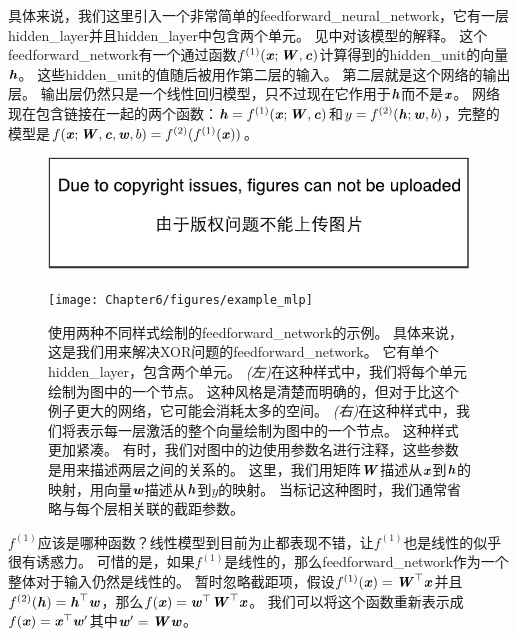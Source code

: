 具体来说，我们这里引入一个非常简单的\gls{feedforward_neural_network}，它有一层\gls{hidden_layer}并且\gls{hidden_layer}中包含两个单元。
见中对该模型的解释。
这个\gls{feedforward_network}有一个通过函数$f^{(1)}(\Vx;\MW, \Vc)$计算得到的\gls{hidden_unit}的向量$\Vh$。
这些\gls{hidden_unit}的值随后被用作第二层的输入。
第二层就是这个网络的输出层。
输出层仍然只是一个线性回归模型，只不过现在它作用于$\Vh$而不是$\Vx$。
网络现在包含链接在一起的两个函数：$\Vh=f^{(1)}(\Vx; \MW, \Vc)$和$y = f^{(2)}(\Vh; \Vw, b)$，完整的模型是$f(\Vx; \MW, \Vc, \Vw, b) = f^{(2)}(f^{(1)}(\Vx))$。
\begin{figure}[!htb]
\ifOpenSource
\centerline{\includegraphics{figure.pdf}}
\else
\centerline{\texttt{[image: Chapter6/figures/example\_mlp]}}
\fi
\captionsetup{singlelinecheck=off}
\caption{使用两种不同样式绘制的\gls{feedforward_network}的示例。
具体来说，这是我们用来解决XOR问题的\gls{feedforward_network}。
它有单个\gls{hidden_layer}，包含两个单元。
\emph{(左)}在这种样式中，我们将每个单元绘制为图中的一个节点。
这种风格是清楚而明确的，但对于比这个例子更大的网络，它可能会消耗太多的空间。
\emph{(右)}在这种样式中，我们将表示每一层激活的整个向量绘制为图中的一个节点。
这种样式更加紧凑。
有时，我们对图中的边使用参数名进行注释，这些参数是用来描述两层之间的关系的。
这里，我们用矩阵$\MW$描述从$\Vx$到$\Vh$的映射，用向量$\Vw$描述从$\Vh$到$y$的映射。
当标记这种图时，我们通常省略与每个层相关联的截距参数。}
\label{fig:chap6_example_mlp}
\end{figure}


$f^{(1)}$应该是哪种函数？线性模型到目前为止都表现不错，让$f^{(1)}$也是线性的似乎很有诱惑力。
可惜的是，如果$f^{(1)}$是线性的，那么\gls{feedforward_network}作为一个整体对于输入仍然是线性的。
暂时忽略截距项，假设$f^{(1)}(\Vx)= \MW^\top \Vx$并且$f^{(2)}(\Vh)=\Vh^\top \Vw$，那么$f(\Vx) = \Vw^\top\MW^\top \Vx$。
我们可以将这个函数重新表示成$f(\Vx) = \Vx^\top\Vw'$其中$\Vw' = \MW\Vw$。


